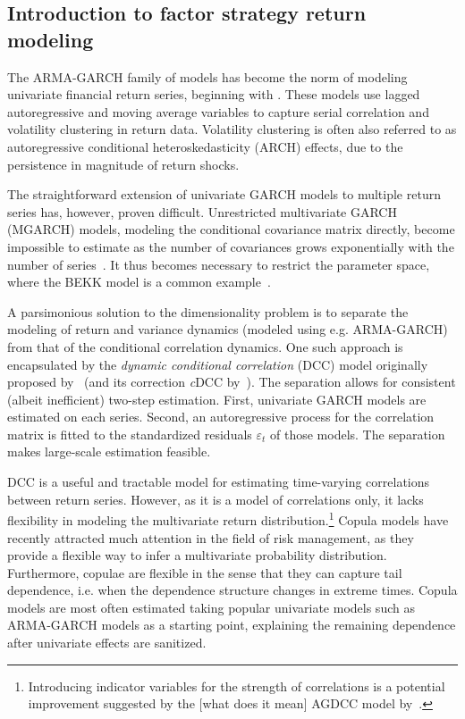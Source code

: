 
\subsection{Introduction to factor strategy return modeling}
\label{subsec:intro_copula}

The ARMA-GARCH family of models has become the norm of modeling univariate financial return series, beginning with \textcite{Bollerslev1986}. These models use lagged autoregressive and moving average variables to capture serial correlation and volatility clustering in return data. Volatility clustering is often also referred to as autoregressive conditional heteroskedasticity (ARCH) effects, due to the persistence in magnitude of return shocks.

The straightforward extension of univariate GARCH models to multiple return series has, however, proven difficult. Unrestricted multivariate GARCH (MGARCH) models, modeling the conditional covariance matrix directly, become impossible to estimate as the number of covariances grows exponentially with the number of series~\autocite{WhyMGARCHSucks}. It thus becomes necessary to restrict the parameter space, where the BEKK model is a common example~\autocite{BEKKModel}.

A parsimonious solution to the dimensionality problem is to separate the modeling of return and variance dynamics (modeled using e.g. ARMA-GARCH) from that of the conditional correlation dynamics. One such approach is encapsulated by the \emph{dynamic conditional correlation} (DCC) model originally proposed by~\autocite{Engle2002} (and its correction \emph{c}DCC by~\autocite{Aielli2013}). The separation allows for consistent (albeit inefficient) two-step estimation. First, univariate GARCH models are estimated on each series. Second, an autoregressive process for the correlation matrix is fitted to the standardized residuals $\varepsilon_t$ of those models. The separation makes large-scale estimation feasible.

DCC is a useful and tractable model for estimating time-varying correlations between return series. However, as it is a model of correlations only, it lacks flexibility in modeling the multivariate return distribution.\footnote{Introducing indicator variables for the strength of correlations is a potential improvement suggested by the [what does it mean] AGDCC model by~\autocite{Cappiello2006}.} Copula models have recently attracted much attention in the field of risk management, as they provide a flexible way to infer a multivariate probability distribution. Furthermore, copulae are flexible in the sense that they can capture tail dependence, i.e. when the dependence structure changes in extreme times. Copula models are most often estimated taking popular univariate models such as ARMA-GARCH models as a starting point, explaining the remaining dependence after univariate effects are sanitized. 


